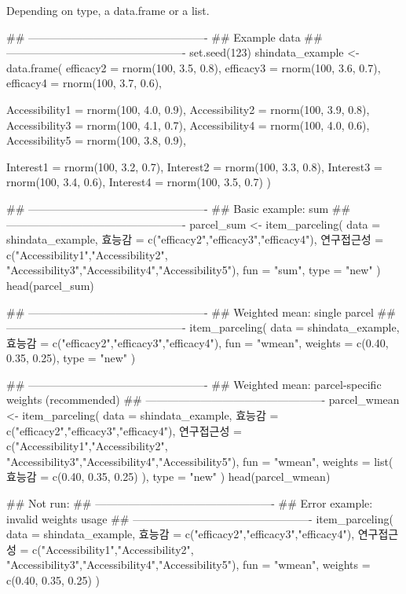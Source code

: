 \documentclass[a4paper]{book}
\begin{document}
%
\begin{Value}
Depending on type, a data.frame or a list.
\end{Value}
%
\begin{Examples}
\begin{ExampleCode}
## -------------------------------------------------
## Example data
## -------------------------------------------------
set.seed(123)
shindata_example <- data.frame(
  efficacy2 = rnorm(100, 3.5, 0.8),
  efficacy3 = rnorm(100, 3.6, 0.7),
  efficacy4 = rnorm(100, 3.7, 0.6),

  Accessibility1 = rnorm(100, 4.0, 0.9),
  Accessibility2 = rnorm(100, 3.9, 0.8),
  Accessibility3 = rnorm(100, 4.1, 0.7),
  Accessibility4 = rnorm(100, 4.0, 0.6),
  Accessibility5 = rnorm(100, 3.8, 0.9),

  Interest1 = rnorm(100, 3.2, 0.7),
  Interest2 = rnorm(100, 3.3, 0.8),
  Interest3 = rnorm(100, 3.4, 0.6),
  Interest4 = rnorm(100, 3.5, 0.7)
)

## -------------------------------------------------
## Basic example: sum
## -------------------------------------------------
parcel_sum <- item_parceling(
  data = shindata_example,
  효능감 = c("efficacy2","efficacy3","efficacy4"),
  연구접근성 = c("Accessibility1","Accessibility2",
                  "Accessibility3","Accessibility4","Accessibility5"),
  fun = "sum",
  type = "new"
)
head(parcel_sum)

## -------------------------------------------------
## Weighted mean: single parcel
## -------------------------------------------------
item_parceling(
  data = shindata_example,
  효능감 = c("efficacy2","efficacy3","efficacy4"),
  fun = "wmean",
  weights = c(0.40, 0.35, 0.25),
  type = "new"
)

## -------------------------------------------------
## Weighted mean: parcel-specific weights (recommended)
## -------------------------------------------------
parcel_wmean <- item_parceling(
  data = shindata_example,
  효능감 = c("efficacy2","efficacy3","efficacy4"),
  연구접근성 = c("Accessibility1","Accessibility2",
                  "Accessibility3","Accessibility4","Accessibility5"),
  fun = "wmean",
  weights = list(
    효능감 = c(0.40, 0.35, 0.25)
  ),
  type = "new"
)
head(parcel_wmean)

\#\# Not run: 
## -------------------------------------------------
## Error example: invalid weights usage
## -------------------------------------------------
item_parceling(
  data = shindata_example,
  효능감 = c("efficacy2","efficacy3","efficacy4"),
  연구접근성 = c("Accessibility1","Accessibility2",
                  "Accessibility3","Accessibility4","Accessibility5"),
  fun = "wmean",
  weights = c(0.40, 0.35, 0.25)
)


\end{ExampleCode}
\end{Examples}
\end{document}
